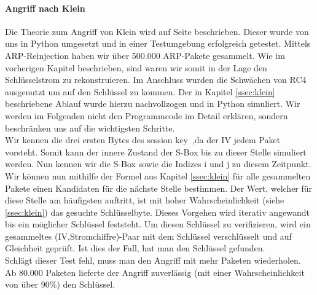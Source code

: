 \documentclass[10pt,a4paper]{article}
\begin{document}
\paragraph{Angriff nach Klein}\label{p:klein_attack}
Die Theorie zum Angriff von Klein wird auf Seite \pageref{ssec:klein} beschrieben. Dieser wurde von uns in Python umgesetzt und in einer Testumgebung erfolgreich getestet. 
Mittels ARP-Reinjection haben wir über 500.000 ARP-Pakete gesammelt. Wie im vorherigen Kapitel beschrieben, sind waren wir somit in der Lage den Schlüsselstrom zu rekonstruieren. 
Im Anschluss wurden die Schwächen von RC4 ausgenutzt um auf den Schlüssel zu kommen. Der in Kapitel \ref{ssec:klein} beschriebene Ablauf wurde hierzu nachvollzogen und  in Python simuliert. Wir werden im Folgenden nicht den Programmcode im Detail erklären, sondern beschränken uns auf die wichtigsten Schritte.\\
Wir kennen die drei ersten Bytes des \glqq session key\grqq\ ,da der IV jedem Paket vorsteht. Somit kann der innere Zustand der S-Box bis zu dieser Stelle simuliert werden. Nun kennen wir die S-Box sowie die Indizes i und j zu diesem Zeitpunkt. Wir können nun mithilfe der Formel aus Kapitel \ref{ssec:klein} für alle gesammelten Pakete einen Kandidaten für die nächste Stelle bestimmen. Der Wert, welcher für diese Stelle am häufigsten auftritt, ist mit hoher Wahrscheinlichkeit (siehe \ref{ssec:klein}) das gesuchte Schlüsselbyte. Dieses Vorgehen wird iterativ angewandt bis ein möglicher Schlüssel feststeht.
Um diesen Schlüssel zu verifizieren, wird ein gesammeltes (IV,Stromchiffre)-Paar mit dem Schlüssel verschlüsselt und auf Gleichheit geprüft. Ist dies der Fall, hat man den Schlüssel gefunden.\\
Schlägt dieser Test fehl, muss man den Angriff mit mehr Paketen wiederholen. Ab 80.000 Paketen lieferte der Angriff zuverlässig (mit einer Wahrscheinlichkeit von über 90\%) den Schlüssel.
\end{document}
